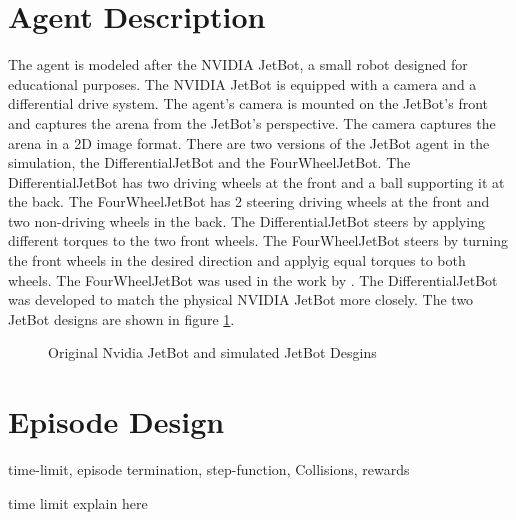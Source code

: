 





\section{Agent Description}

The agent is modeled after the NVIDIA JetBot, a small robot designed for educational purposes. The NVIDIA JetBot is equipped with a camera and a differential drive system. The agent's camera is mounted on the JetBot's front and captures the arena from the JetBot's perspective. The camera captures the arena in a 2D image format. 
There are two versions of the JetBot agent in the simulation, the DifferentialJetBot and the FourWheelJetBot. The DifferentialJetBot has two driving wheels at the front and a ball supporting it at the back. The FourWheelJetBot has 2 steering driving wheels at the front and two non-driving wheels in the back. The DifferentialJetBot steers by applying different torques to the two front wheels. The FourWheelJetBot steers by turning the front wheels in the desired direction and applyig equal torques to both wheels.
The FourWheelJetBot was used in the work by \autocite{maximilian}. The DifferentialJetBot was developed to match the physical NVIDIA JetBot more closely. The two JetBot designs are shown in figure \ref{fig:jetbots}.

\begin{figure}
    \centering
    \qquad
    \qquad
    \qquad
    \caption{Original Nvidia JetBot and simulated JetBot Desgins}
    \label{fig:jetbots}
\end{figure}


\section{Episode Design}

time-limit, episode termination, step-function, Collisions, rewards

time limit explain here

\label{time_limit}
